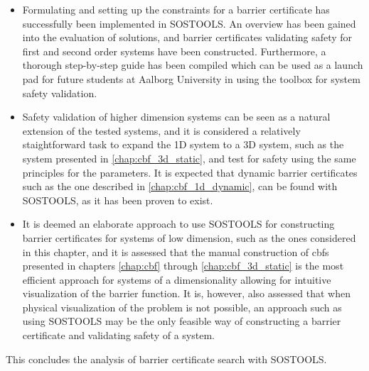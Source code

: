 \begin{itemize}
\item Formulating and setting up the constraints for a barrier certificate has successfully been implemented in SOSTOOLS. An overview has been gained into the evaluation of solutions, and barrier certificates validating safety for first and second order systems have been constructed. Furthermore, a thorough step-by-step guide has been compiled which can be used as a launch pad for future students at Aalborg University in using the toolbox for system safety validation. 

\item Safety validation of  higher dimension systems can be seen as a natural extension of the tested systems, and it is considered a relatively staightforward task to expand the 1D system to a 3D system, such as the system presented in \autoref{chap:cbf_3d_static}, and test for safety using the same principles for the parameters. It is expected that dynamic barrier certificates such as the one described in \autoref{chap:cbf_1d_dynamic}, can be found with SOSTOOLS, as it has been proven to exist.

\item It is deemed an elaborate approach to use SOSTOOLS for constructing barrier certificates for systems of low dimension, such as the ones considered in this chapter, and it is assessed that the manual construction of \glspl{cbf} presented in chapters \ref{chap:cbf} through \ref{chap:cbf_3d_static} is the most efficient approach for systems of a dimensionality allowing for intuitive visualization of the barrier function.
It is, however, also assessed that when physical visualization of the problem is not possible, an approach such as using SOSTOOLS may be the only feasible way of constructing a barrier certificate and validating safety of a system.
\end{itemize}

This concludes the analysis of barrier certificate search with SOSTOOLS.



